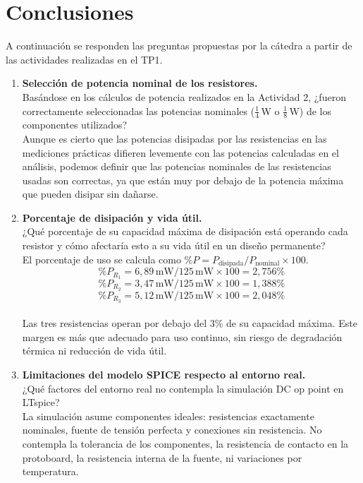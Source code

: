 \documentclass[12pt,a4paper]{article}
\begin{document}
\section{Conclusiones}
 
A continuación se responden las preguntas propuestas por la cátedra
a partir de las actividades realizadas en el TP1.
 
\begin{enumerate}[leftmargin=*, label=\textbf{\arabic*.}]
 
    \item \textbf{Selección de potencia nominal de los resistores.}\\
    Basándose en los cálculos de potencia realizados en la Actividad 2,
    ¿fueron correctamente seleccionadas las potencias nominales
    ($\frac{1}{4}$\,W o $\frac{1}{8}$\,W) de los componentes utilizados?\\[4pt]
    Aunque es cierto que las potencias disipadas por las resistencias en las mediciones prácticas difieren levemente con las potencias calculadas en el análisis, podemos definir que las potencias nominales de las resistencias usadas son correctas, ya que están muy por debajo de la potencia máxima que pueden disipar sin dañarse.
 
    \item \textbf{Porcentaje de disipación y vida útil.}\\
    ¿Qué porcentaje de su capacidad máxima de disipación está operando
    cada resistor y cómo afectaría esto a su vida útil en un diseño permanente?\\[4pt]
    El porcentaje de uso se calcula como $\%P = P_{\text{disipada}} / P_{\text{nominal}} \times 100$. \\
    $$\%P_{R_1} = 6{,}89\,\text{mW} / 125\,\text{mW} \times 100 = 2{,}756\%$$
    $$\%P_{R_2} = 3{,}47\,\text{mW} / 125\,\text{mW} \times 100 = 1{,}388\%$$
    $$\%P_{R_3} = 5{,}12\,\text{mW} / 125\,\text{mW} \times 100 = 2{,}048\%$$
    \\
    Las tres resistencias operan por debajo del 3\% de su capacidad máxima. Este margen es más que adecuado para uso continuo, sin riesgo de degradación térmica ni reducción de vida útil. \\
 
    \item \textbf{Limitaciones del modelo SPICE respecto al entorno real.}\\
    ¿Qué factores del entorno real no contempla la simulación DC op point en LTspice?\\[4pt]
    La simulación asume componentes ideales: resistencias exactamente nominales, fuente de tensión perfecta y conexiones sin resistencia. No contempla la tolerancia de los componentes, la resistencia de contacto en la protoboard, la resistencia interna de la fuente, ni variaciones por temperatura.
 

\end{enumerate}
\end{document}
